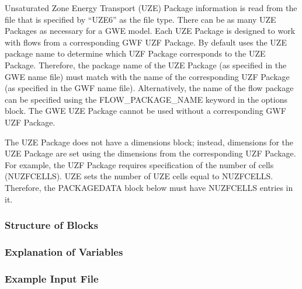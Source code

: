 Unsaturated Zone Energy Transport (UZE) Package information is read from the file that is specified by ``UZE6'' as the file type.  There can be as many UZE Packages as necessary for a GWE model. Each UZE Package is designed to work with flows from a corresponding GWF UZF Package. By default \mf uses the UZE package name to determine which UZF Package corresponds to the UZE Package.  Therefore, the package name of the UZE Package (as specified in the GWE name file) must match with the name of the corresponding UZF Package (as specified in the GWF name file).  Alternatively, the name of the flow package can be specified using the FLOW\_PACKAGE\_NAME keyword in the options block.  The GWE UZE Package cannot be used without a corresponding GWF UZF Package.

The UZE Package does not have a dimensions block; instead, dimensions for the UZE Package are set using the dimensions from the corresponding UZF Package.  For example, the UZF Package requires specification of the number of cells (NUZFCELLS).  UZE sets the number of UZE cells equal to NUZFCELLS.  Therefore, the PACKAGEDATA block below must have NUZFCELLS entries in it.

\vspace{5mm}
\subsubsection{Structure of Blocks}




\vspace{5mm}
\subsubsection{Explanation of Variables}
\begin{description}

\end{description}

\vspace{5mm}
\subsubsection{Example Input File}


\vspace{5mm}
